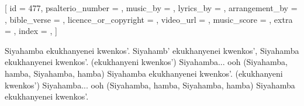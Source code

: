 % 

[
    id                     = {477},
    psalterio_number       = {},
    music_by               = {},
    lyrics_by              = {},
    arrangement_by         = {},
    bible_verse            = {},
    licence_or_copyright   = {},
    video_url              = {},
    music_score            = {},
    extra                  = {},
    index                  = {},
]


\beginchorus
Siyahamba ekukhanyenei kwenkos'.
Siyahamb' ekukhanyenei kwenkos',
Siyahamba ekukhanyenei kwenkos'. (ekukhanyeni kwenkos')
Siyahamba... ooh
(Siyahamba, hamba, Siyahamba, hamba)
Siyahamba ekukhanyenei kwenkos'. (ekukhanyeni kwenkos')
Siyahamba... ooh
(Siyahamba, hamba, Siyahamba, hamba)
Siyahamba ekukhanyenei kwenkos'.
\endchorus

\endsong
